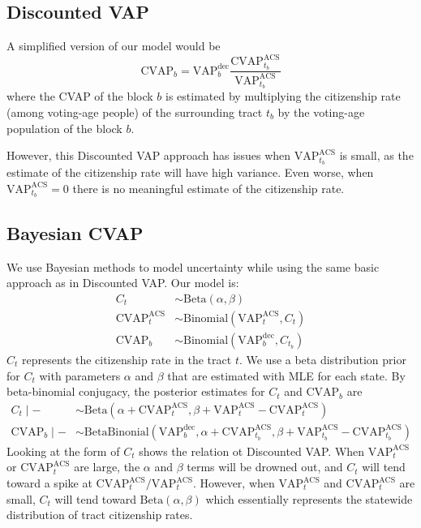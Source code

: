 \documentclass{article}
\newcommand{\vap}[1]{\text{VAP}^\text{#1}}
\newcommand{\cvap}[1]{\text{CVAP}^\text{#1}}
\begin{document}
\subsection{Discounted VAP}
A simplified version of our model would be $$\cvap{}_b = \vap{dec}_b \frac{\cvap{ACS}_{t_b}}{\vap{ACS}_{t_b}}$$ where the CVAP of the block $b$ is estimated by multiplying the citizenship rate (among voting-age people) of the surrounding tract $t_b$ by the voting-age population of the block $b$.

However, this Discounted VAP approach has issues when $\vap{ACS}_{t_b}$ is small, as the estimate of the citizenship rate will have high variance. Even worse, when $\vap{ACS}_{t_b} = 0$ there is no meaningful estimate of the citizenship rate.

\subsection{Bayesian CVAP}

We use Bayesian methods to model uncertainty while using the same basic approach as in Discounted VAP. Our model is:
\begin{align*}
    C_t &\sim \text{Beta}(\alpha, \beta) \\
    \cvap{ACS}_t &\sim \text{Binomial}(\vap{ACS}_t, C_t) \\
    \cvap{}_b &\sim \text{Binomial}(\vap{dec}_b, C_{t_b})
\end{align*}
$C_t$ represents the citizenship rate in the tract $t$. We use a beta distribution prior for $C_t$ with parameters $\alpha$ and $\beta$ that are estimated with MLE for each state. By beta-binomial conjugacy, the posterior estimates for $C_t$ and $\cvap{}_b$ are
\begin{align*}
    C_t \mid - &\sim \text{Beta}(\alpha + \cvap{ACS}_t, \beta + \vap{ACS}_t - \cvap{ACS}_t) \\
    \cvap{}_b \mid - &\sim \text{BetaBinonial}(\vap{dec}_b, \alpha + \cvap{ACS}_{t_b}, \beta + \vap{ACS}_{t_b} - \cvap{ACS}_{t_b})
\end{align*}
Looking at the form of $C_t$ shows the relation ot Discounted VAP. When $\vap{ACS}_t$ or $\cvap{ACS}_t$ are large, the $\alpha$ and $\beta$ terms will be drowned out, and $C_t$ will tend toward a spike at $\cvap{ACS}_t / \vap{ACS}_t$. However, when $\vap{ACS}_t$ and $\cvap{ACS}_t$ are small, $C_t$ will tend toward $\text{Beta}(\alpha, \beta)$ which essentially represents the statewide distribution of tract citizenship rates.
\end{document}

